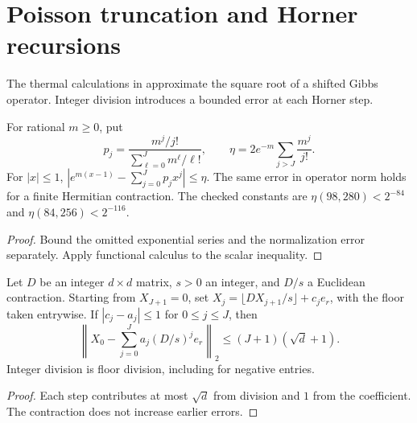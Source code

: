 \section{Poisson truncation and Horner recursions}

The thermal calculations in \cite[Appendices A and B]{OpenAIHaldane} approximate the square root
of a shifted Gibbs operator. Integer division introduces a bounded error at each Horner step.

\begin{lemma}
  \label{lem:trace-poisson}
  \leanok
  For rational \(m\ge0\), put
  \[
    p_j=\frac{m^j/j!}{\sum_{\ell=0}^J m^\ell/\ell!},
    \qquad \eta=2e^{-m}\sum_{j>J}\frac{m^j}{j!}.
  \]
  For \(|x|\le1\), \(|e^{m(x-1)}-\sum_{j=0}^Jp_jx^j|\le\eta\).
  The same error in operator norm holds for a finite Hermitian contraction.
  The checked constants are \(\eta(98,280)<2^{-84}\) and \(\eta(84,256)<2^{-116}\).
\end{lemma}
\begin{proof}
  \leanok
  Bound the omitted exponential series and the normalization error separately.
  Apply functional calculus to the scalar inequality.
\end{proof}

\begin{lemma}
  \label{lem:trace-horner}
  \leanok
  Let \(D\) be an integer \(d\times d\) matrix, \(s>0\) an integer, and \(D/s\) a Euclidean
  contraction. Starting from \(X_{J+1}=0\), set
  \(X_j=\lfloor DX_{j+1}/s\rfloor+c_je_r\), with the floor taken entrywise.
  If \(|c_j-a_j|\le1\) for \(0\le j\le J\), then
  \[
    \left\|X_0-\sum_{j=0}^J a_j(D/s)^je_r\right\|_2
    \le(J+1)(\sqrt d+1).
  \]
  Integer division is floor division, including for negative entries.
\end{lemma}
\begin{proof}
  \leanok
  Each step contributes at most \(\sqrt d\) from division and \(1\) from the coefficient.
  The contraction does not increase earlier errors.
\end{proof}

